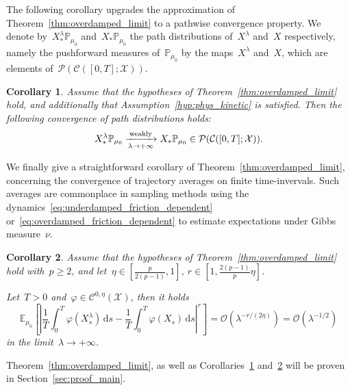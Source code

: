 \documentclass[10pt]{article}
\renewcommand{\d}{\mathrm{d}}
\newcommand{\E}{\mathbb{E}}
\renewcommand{\P}{\mathbb{P}}
\newcommand{\cX}{\mathcal{X}}
\newcommand{\cP}{\mathcal{P}}
\newcommand{\1}{\mathbbm 1}
\newcommand{\bigo}{\mathcal{O}}
\newtheorem{corollary}{Corollary}
\begin{document}
The following corollary upgrades the approximation of Theorem~\ref{thm:overdamped_limit} to a pathwise convergence property. We denote by~$X^\lambda_*\P_{\mu_0}$ and~$X_*\P_{\mu_0}$ the path distributions of~$X^\lambda$ and~$X$ respectively, namely the pushforward measures of~$\P_{\mu_0}$ by the maps~$X^\lambda$ and~$X$, which are elements of~$\cP\left(\mathcal C([0,T];\cX)\right)$.
\begin{corollary}
    \label{corr:pathwise}
 Assume that the hypotheses of Theorem~\ref{thm:overdamped_limit} hold, and additionally that Assumption~\ref{hyp:phys_kinetic} is satisfied. Then the following convergence of path distributions holds:
    \begin{equation}
    \label{eq:convergence_in_law}
    X^\lambda_* \P_{\mu_0}\xrightarrow[\lambda\to +\infty]{\rm{weakly}}X_*\P_{\mu_0}\in\mathcal P(\mathcal C([0,T];\cX)).
\end{equation}
\end{corollary}
We finally give a straightforward corollary of Theorem~\ref{thm:overdamped_limit}, concerning the convergence of trajectory averages on finite time-invervals. Such averages are commonplace in sampling methods using the dynamics~\eqref{eq:underdamped_friction_dependent} or~\eqref{eq:overdamped_friction_dependent} to estimate expectations under Gibbs measure~$\nu$.
\begin{corollary}
    \label{corr:traj_averages}
    Assume that the hypotheses of Theorem~\ref{thm:overdamped_limit} hold with~$p\geq 2$, and let~$\eta\in\left[\frac{p}{2(p-1)},1\right]$, $r\in\left[1,\frac{2(p-1)}{p}\eta\right]$.
    
    Let~$T>0$ and~$\varphi\in \mathcal C^{0,\eta}(\cX)$, then it holds
    \begin{equation}
        \E_{\mu_0}\left[\left|\frac1T\int_0^T \varphi(X_s^\lambda)\,\d s - \frac1T\int_0^T \varphi(X_s)\,\d s\right|^r\right] = \bigo\left(\lambda^{-r/(2\eta)}\right) = \bigo\left(\lambda^{-1/2}\right)
    \end{equation}
    in the limit~$\lambda\to +\infty$.
\end{corollary}

Theorem~\ref{thm:overdamped_limit}, as well as Corollaries~\ref{corr:pathwise} and~\ref{corr:traj_averages} will be proven in Section~\ref{sec:proof_main}.
\end{document}
